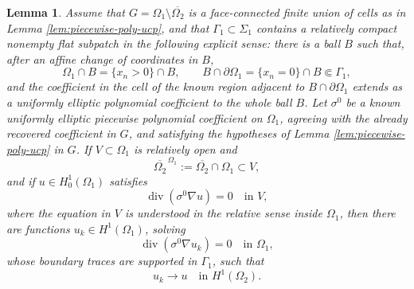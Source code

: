 \documentclass[10pt,a4paper]{amsart}
\newtheorem{lemma}[theorem]{Lemma}
\newcommand{\diver}{\operatorname{div}}
\begin{document}
\begin{lemma}
\label{lem:runge-known-shell}
Assume that \(G=\Omega_1\setminus\overline{\Omega_2}\) is a face-connected
finite union of cells as in Lemma \ref{lem:piecewise-poly-ucp}, and that
\(\Gamma_1\subset\Sigma_1\) contains a relatively compact nonempty flat
subpatch in the following explicit sense: there is a ball \(B\) such that,
after an affine change of coordinates in \(B\),
\begin{equation}
  \Omega_1\cap B=\{x_n>0\}\cap B,
  \qquad
  B\cap\partial\Omega_1=\{x_n=0\}\cap B\Subset \Gamma_1,
\end{equation}
and the coefficient in the cell of the known region adjacent to \(B\cap\partial\Omega_1\)
extends as a uniformly elliptic polynomial coefficient to the whole ball
\(B\).  Let \(\sigma^0\) be a known
uniformly elliptic piecewise polynomial coefficient on \(\Omega_1\), agreeing
with the already recovered coefficient in \(G\), and satisfying the hypotheses
of Lemma \ref{lem:piecewise-poly-ucp} in \(G\).  If
\(V\subset\Omega_1\) is relatively open and
\begin{equation}
  \overline{\Omega_2}^{\,\Omega_1}:=\overline{\Omega_2}\cap\Omega_1
  \subset V,
\end{equation}
and if \(u\in H^1_0(\Omega_1)\) satisfies
\begin{equation}
  \diver(\sigma^0\nabla u)=0\quad\text{in }V,
\end{equation}
where the equation in \(V\) is understood in the relative sense inside
\(\Omega_1\), then there are functions \(u_k\in H^1(\Omega_1)\), solving
\begin{equation}
  \diver(\sigma^0\nabla u_k)=0\quad\text{in }\Omega_1,
\end{equation}
whose boundary traces are supported in \(\Gamma_1\), such that
\begin{equation}
  u_k\to u\quad\text{in }H^1(\Omega_2).
\end{equation}
\end{lemma}
\end{document}
